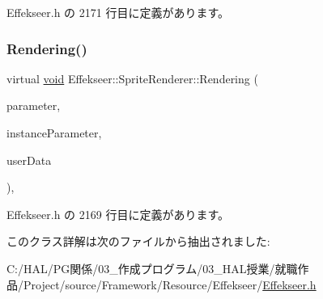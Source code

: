  Effekseer.\+h の 2171 行目に定義があります。

\mbox{\label{class_effekseer_1_1_sprite_renderer_a8e3f9a32bb103082e32a754fd689bbef}} 
\subsubsection{\texorpdfstring{Rendering()}{Rendering()}}
{\footnotesize\ttfamily virtual \mbox{\hyperlink{namespace_effekseer_ab34c4088e512200cf4c2716f168deb56}{void}} Effekseer\+::\+Sprite\+Renderer\+::\+Rendering (\begin{DoxyParamCaption}\item[{const \mbox{\hyperlink{struct_effekseer_1_1_sprite_renderer_1_1_node_parameter}{Node\+Parameter}} \&}]{parameter,  }\item[{const \mbox{\hyperlink{struct_effekseer_1_1_sprite_renderer_1_1_instance_parameter}{Instance\+Parameter}} \&}]{instance\+Parameter,  }\item[{\mbox{\hyperlink{namespace_effekseer_ab34c4088e512200cf4c2716f168deb56}{void}} $\ast$}]{user\+Data }\end{DoxyParamCaption})\hspace{0.3cm}{\ttfamily [inline]}, {\ttfamily [virtual]}}



 Effekseer.\+h の 2169 行目に定義があります。



このクラス詳解は次のファイルから抽出されました\+:\begin{DoxyCompactItemize}
\item 
C\+:/\+H\+A\+L/\+P\+G関係/03\+\_\+作成プログラム/03\+\_\+\+H\+A\+L授業/就職作品/\+Project/source/\+Framework/\+Resource/\+Effekseer/\mbox{\hyperlink{_effekseer_8h}{Effekseer.\+h}}\end{DoxyCompactItemize}
